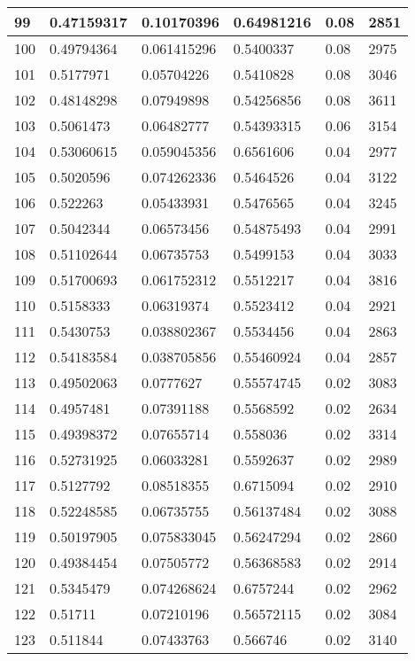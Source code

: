 \begin{longtable}{|l|l|l|l|l|l|}
99 & 0.47159317 & 0.10170396 & 0.64981216 & 0.08 & 2851 \\ \hline 
100 & 0.49794364 & 0.061415296 & 0.5400337 & 0.08 & 2975 \\ \hline 
101 & 0.5177971 & 0.05704226 & 0.5410828 & 0.08 & 3046 \\ \hline 
102 & 0.48148298 & 0.07949898 & 0.54256856 & 0.08 & 3611 \\ \hline 
103 & 0.5061473 & 0.06482777 & 0.54393315 & 0.06 & 3154 \\ \hline 
104 & 0.53060615 & 0.059045356 & 0.6561606 & 0.04 & 2977 \\ \hline 
105 & 0.5020596 & 0.074262336 & 0.5464526 & 0.04 & 3122 \\ \hline 
106 & 0.522263 & 0.05433931 & 0.5476565 & 0.04 & 3245 \\ \hline 
107 & 0.5042344 & 0.06573456 & 0.54875493 & 0.04 & 2991 \\ \hline 
108 & 0.51102644 & 0.06735753 & 0.5499153 & 0.04 & 3033 \\ \hline 
109 & 0.51700693 & 0.061752312 & 0.5512217 & 0.04 & 3816 \\ \hline 
110 & 0.5158333 & 0.06319374 & 0.5523412 & 0.04 & 2921 \\ \hline 
111 & 0.5430753 & 0.038802367 & 0.5534456 & 0.04 & 2863 \\ \hline 
112 & 0.54183584 & 0.038705856 & 0.55460924 & 0.04 & 2857 \\ \hline 
113 & 0.49502063 & 0.0777627 & 0.55574745 & 0.02 & 3083 \\ \hline 
114 & 0.4957481 & 0.07391188 & 0.5568592 & 0.02 & 2634 \\ \hline 
115 & 0.49398372 & 0.07655714 & 0.558036 & 0.02 & 3314 \\ \hline 
116 & 0.52731925 & 0.06033281 & 0.5592637 & 0.02 & 2989 \\ \hline 
117 & 0.5127792 & 0.08518355 & 0.6715094 & 0.02 & 2910 \\ \hline 
118 & 0.52248585 & 0.06735755 & 0.56137484 & 0.02 & 3088 \\ \hline 
119 & 0.50197905 & 0.075833045 & 0.56247294 & 0.02 & 2860 \\ \hline 
120 & 0.49384454 & 0.07505772 & 0.56368583 & 0.02 & 2914 \\ \hline 
121 & 0.5345479 & 0.074268624 & 0.6757244 & 0.02 & 2962 \\ \hline 
122 & 0.51711 & 0.07210196 & 0.56572115 & 0.02 & 3084 \\ \hline 
123 & 0.511844 & 0.07433763 & 0.566746 & 0.02 & 3140 \\ \hline 

\end{longtable}
